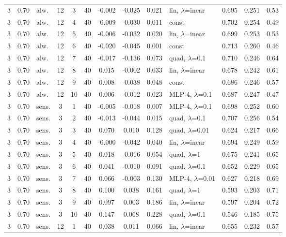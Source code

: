 \documentclass[10pt]{article}
\begin{document}
\begin{scriptsize}
\begin{longtable}{cclcc c ccc l ccc}
3 & 0.70 & alw. & 12 & 3 & 40 & -0.002 & -0.025 & 0.021 & lin, $\lambda$=inear & 0.695 & 0.251 & 0.53 \\
3 & 0.70 & alw. & 12 & 4 & 40 & -0.009 & -0.030 & 0.011 & const & 0.702 & 0.254 & 0.49 \\
3 & 0.70 & alw. & 12 & 5 & 40 & -0.006 & -0.032 & 0.020 & lin, $\lambda$=inear & 0.699 & 0.253 & 0.53 \\
3 & 0.70 & alw. & 12 & 6 & 40 & -0.020 & -0.045 & 0.001 & const & 0.713 & 0.260 & 0.46 \\
3 & 0.70 & alw. & 12 & 7 & 40 & -0.017 & -0.136 & 0.073 & quad, $\lambda$=0.1 & 0.710 & 0.246 & 0.64 \\
3 & 0.70 & alw. & 12 & 8 & 40 & 0.015 & -0.002 & 0.033 & lin, $\lambda$=inear & 0.678 & 0.242 & 0.61 \\
3 & 0.70 & alw. & 12 & 9 & 40 & 0.008 & -0.038 & 0.048 & const & 0.686 & 0.246 & 0.57 \\
3 & 0.70 & alw. & 12 & 10 & 40 & 0.006 & -0.012 & 0.023 & MLP-4, $\lambda$=0.1 & 0.687 & 0.247 & 0.47 \\
3 & 0.70 & sens. & 3 & 1 & 40 & -0.005 & -0.018 & 0.007 & MLP-4, $\lambda$=0.1 & 0.698 & 0.252 & 0.60 \\
3 & 0.70 & sens. & 3 & 2 & 40 & -0.013 & -0.044 & 0.015 & quad, $\lambda$=0.1 & 0.707 & 0.256 & 0.54 \\
3 & 0.70 & sens. & 3 & 3 & 40 & 0.070 & 0.010 & 0.128 & quad, $\lambda$=0.01 & 0.624 & 0.217 & 0.66 \\
3 & 0.70 & sens. & 3 & 4 & 40 & -0.000 & -0.042 & 0.040 & lin, $\lambda$=inear & 0.694 & 0.249 & 0.59 \\
3 & 0.70 & sens. & 3 & 5 & 40 & 0.018 & -0.016 & 0.054 & quad, $\lambda$=1 & 0.675 & 0.241 & 0.65 \\
3 & 0.70 & sens. & 3 & 6 & 40 & 0.041 & -0.010 & 0.091 & quad, $\lambda$=0.1 & 0.652 & 0.229 & 0.65 \\
3 & 0.70 & sens. & 3 & 7 & 40 & 0.066 & -0.003 & 0.130 & MLP-4, $\lambda$=0.01 & 0.627 & 0.218 & 0.69 \\
3 & 0.70 & sens. & 3 & 8 & 40 & 0.100 & 0.038 & 0.161 & quad, $\lambda$=1 & 0.593 & 0.203 & 0.71 \\
3 & 0.70 & sens. & 3 & 9 & 40 & 0.097 & 0.003 & 0.186 & lin, $\lambda$=inear & 0.597 & 0.204 & 0.72 \\
3 & 0.70 & sens. & 3 & 10 & 40 & 0.147 & 0.068 & 0.228 & quad, $\lambda$=0.1 & 0.546 & 0.185 & 0.75 \\
3 & 0.70 & sens. & 12 & 1 & 40 & 0.038 & 0.011 & 0.066 & lin, $\lambda$=inear & 0.655 & 0.232 & 0.57 \\

\end{longtable}
\end{scriptsize}
\end{document}
